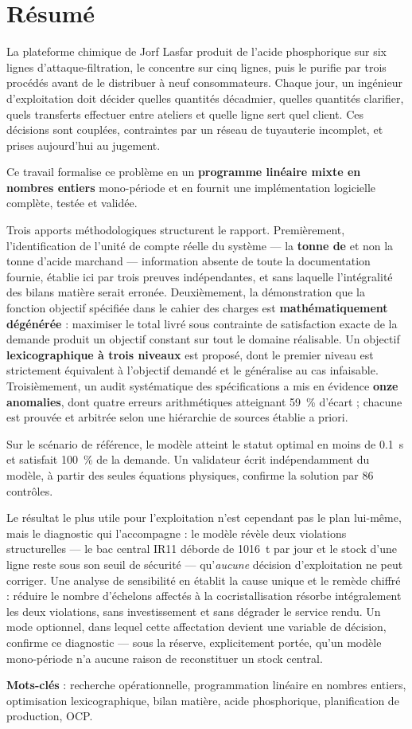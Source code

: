 \chapter*{Résumé}

La plateforme chimique de Jorf Lasfar produit de l'acide phosphorique sur six lignes
d'attaque-filtration, le concentre sur cinq lignes, puis le purifie par trois procédés
avant de le distribuer à neuf consommateurs. Chaque jour, un ingénieur d'exploitation doit
décider quelles quantités décadmier, quelles quantités clarifier, quels transferts effectuer
entre ateliers et quelle ligne sert quel client. Ces décisions sont couplées, contraintes
par un réseau de tuyauterie incomplet, et prises aujourd'hui au jugement.

Ce travail formalise ce problème en un \textbf{programme linéaire mixte en nombres entiers}
mono-période et en fournit une implémentation logicielle complète, testée et validée.

Trois apports méthodologiques structurent le rapport. Premièrement, l'identification de
l'unité de compte réelle du système --- la \textbf{tonne de \PdeuxOcinq{}} et non la tonne
d'acide marchand --- information absente de toute la documentation fournie, établie ici par
trois preuves indépendantes, et sans laquelle l'intégralité des bilans matière serait
erronée. Deuxièmement, la démonstration que la fonction objectif spécifiée dans le cahier
des charges est \textbf{mathématiquement dégénérée} : maximiser le total livré sous
contrainte de satisfaction exacte de la demande produit un objectif constant sur tout le
domaine réalisable. Un objectif \textbf{lexicographique à trois niveaux} est proposé, dont
le premier niveau est strictement équivalent à l'objectif demandé et le généralise au cas
infaisable. Troisièmement, un audit systématique des spécifications a mis en évidence
\textbf{onze anomalies}, dont quatre erreurs arithmétiques atteignant \SI{59}{\percent}
d'écart ; chacune est prouvée et arbitrée selon une hiérarchie de sources établie a priori.

Sur le scénario de référence, le modèle atteint le statut optimal en moins de \SI{0.1}{\second} et
satisfait \SI{100}{\percent} de la demande. Un validateur écrit indépendamment du modèle,
à partir des seules équations physiques, confirme la solution par 86 contrôles.

Le résultat le plus utile pour l'exploitation n'est cependant pas le plan lui-même, mais le
diagnostic qui l'accompagne : le modèle révèle deux violations structurelles --- le bac
central IR11 déborde de \SI{1016}{\tonne} par jour et le stock d'une ligne reste sous son
seuil de sécurité --- qu'\emph{aucune} décision d'exploitation ne peut corriger. Une analyse
de sensibilité en établit la cause unique et le remède chiffré : réduire le nombre
d'échelons affectés à la cocristallisation résorbe intégralement les deux violations, sans
investissement et sans dégrader le service rendu. Un mode optionnel, dans lequel cette
affectation devient une variable de décision, confirme ce diagnostic --- sous la réserve,
explicitement portée, qu'un modèle mono-période n'a aucune raison de reconstituer un stock
central.

\vspace{0.8cm}
\noindent\textbf{Mots-clés} : recherche opérationnelle, programmation linéaire en nombres
entiers, optimisation lexicographique, bilan matière, acide phosphorique, planification de
production, OCP.

\cleardoublepage
